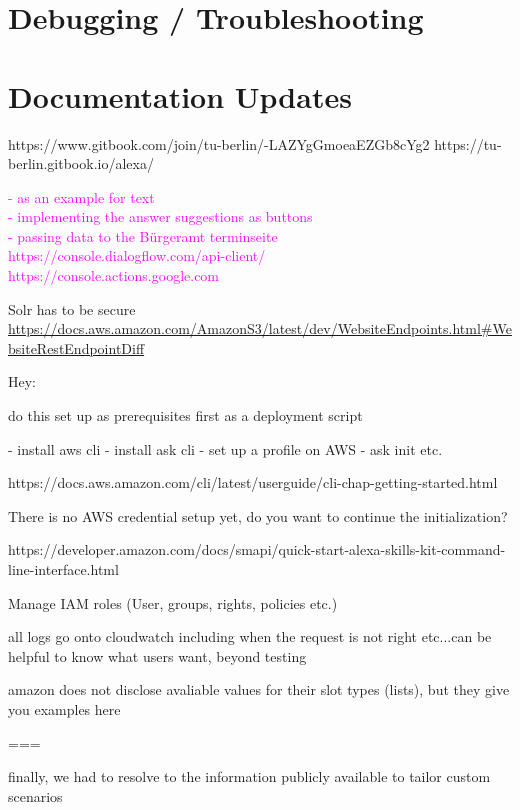 \section{Debugging / Troubleshooting}

\section{Documentation Updates}
https://www.gitbook.com/join/tu-berlin/-LAZYgGmoeaEZGb8cYg2
https://tu-berlin.gitbook.io/alexa/

\textcolor{magenta}{
- as an example for text\\
- implementing the answer suggestions as buttons\\
- passing data to the Bürgeramt terminseite\\
https://console.dialogflow.com/api-client/ \\
https://console.actions.google.com
}


Solr has to be secure
\url{https://docs.aws.amazon.com/AmazonS3/latest/dev/WebsiteEndpoints.html#WebsiteRestEndpointDiff}


Hey:

do this set up as prerequisites first
as a deployment script

- install aws cli
- install ask cli
- set up a profile on AWS
- ask init etc.

https://docs.aws.amazon.com/cli/latest/userguide/cli-chap-getting-started.html

There is no AWS credential setup yet, do you want to continue the initialization?

https://developer.amazon.com/docs/smapi/quick-start-alexa-skills-kit-command-line-interface.html



Manage IAM roles (User, groups, rights, policies etc.)


all logs go onto cloudwatch
including when the request is not right etc...can be helpful to know what users want, beyond testing





amazon does not disclose avaliable values for their slot types (lists), but they give you examples here


===

finally, we had to resolve to the information publicly available to tailor custom scenarios



